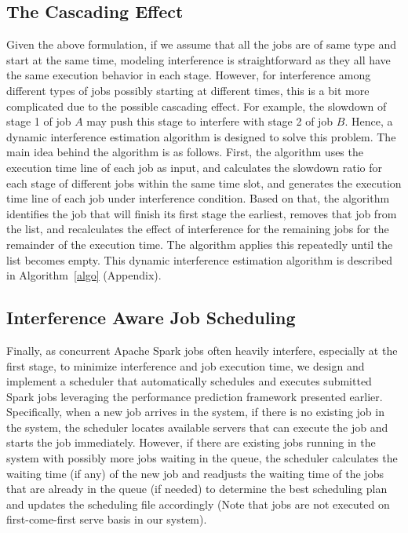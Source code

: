 \subsection{The Cascading Effect}
Given the above formulation, if we assume that all the jobs are of same type and start at the same time, modeling interference is straightforward as they all have the same execution behavior in each stage. However, for interference among different types of jobs possibly starting at different times, this is a bit more complicated due to the possible cascading effect. For example, the slowdown of stage 1 of job $A$ may push this stage to interfere with stage 2 of job $B$. Hence, a dynamic interference estimation algorithm is designed to solve this problem. The main idea behind the algorithm is as follows. First, the algorithm uses the execution time line of each job as input, and calculates the slowdown ratio for each stage of different jobs within the same time slot, and generates the execution time line of each job under interference condition. Based on that, the algorithm identifies the job that will finish its first stage the earliest, removes that job from the list, and recalculates the effect of interference for the remaining jobs for the remainder of the execution time. The algorithm applies this repeatedly until the list becomes empty. This dynamic interference estimation algorithm is described in Algorithm~\ref{algo} (Appendix).





\subsection{Interference Aware Job Scheduling}
\label{scheduler}

Finally, as concurrent Apache Spark jobs often heavily interfere, especially at the first stage, to minimize interference and job execution time, we design and implement a scheduler that automatically schedules and executes submitted Spark jobs leveraging the performance prediction framework presented earlier. Specifically, when a new job arrives in the system, if there is no existing job in the system, the scheduler locates available servers that can execute the job and starts the job immediately. However, if there are existing jobs running in the system with possibly more jobs waiting in the queue, the scheduler calculates the waiting time (if any) of the new job and readjusts the waiting time of the jobs that are already in the queue (if needed) to determine the best scheduling plan and updates the scheduling file accordingly (Note that jobs are not executed on first-come-first serve basis in our system). 

